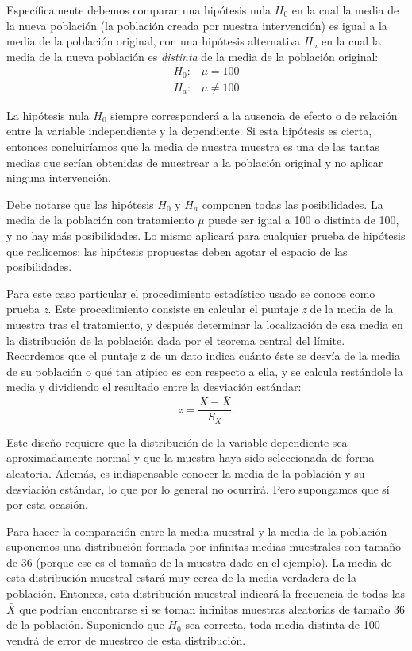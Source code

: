 \documentclass[a4paper,12pt]{article}
\begin{document}
Específicamente debemos comparar una  hipótesis nula $H_{0}$ en la cual la media de la nueva población (la población creada por nuestra intervención) es igual a la media de la población original, con una hipótesis alternativa $H_{a}$ en la cual la media de la nueva población es {\slshape distinta} de la media de la población original:
\begin{eqnarray*}
  H_{0}: & \mu = 100\\
  H_{a}: & \mu \neq 100
\end{eqnarray*}

La hipótesis nula $H_{0}$ siempre corresponderá a la ausencia de efecto o de relación entre la variable independiente y la dependiente. Si esta hipótesis es cierta, entonces concluiríamos que la media de nuestra muestra es una de las tantas medias que serían obtenidas de muestrear a la población original y no aplicar ninguna intervención.

Debe notarse que las hipótesis $H_{0}$ y $H_{a}$ componen todas las posibilidades. La media de la población con tratamiento $\mu$ puede ser igual a 100 o distinta de 100, y no hay más posibilidades. Lo mismo aplicará para cualquier prueba de hipótesis que realicemos: las hipótesis propuestas deben agotar el espacio de las posibilidades.

Para este caso particular el procedimiento estadístico usado se conoce como prueba {\itshape z}. Este procedimiento consiste en calcular el puntaje {\itshape z} de la media de la muestra tras el tratamiento, y después determinar la localización de esa media en la distribución de la población dada por el teorema central del límite. Recordemos que el puntaje z de un dato indica cuánto éste se desvía de la media de su población o qué tan atípico es con respecto a ella, y se calcula restándole la media y dividiendo el resultado entre la desviación estándar:
\[
z = \frac{
  X - \bar{X}
}{
  S_{X}
}
.\]

Este diseño requiere que la distribución de la variable dependiente sea aproximadamente normal y que la muestra haya sido seleccionada de forma aleatoria. Además, es indispensable conocer la media de la población y su desviación estándar, lo que por lo general no ocurrirá. Pero supongamos que sí por esta ocasión.

Para hacer la comparación entre la media muestral y la media de la población suponemos una distribución formada por infinitas medias muestrales con tamaño de 36 (porque ese es el tamaño de la muestra dado en el ejemplo). La media de esta distribución muestral estará muy cerca de la media verdadera de la población. Entonces, esta distribución muestral indicará la frecuencia de todas las $\bar{X}$ que podrían encontrarse si se toman infinitas muestras aleatorias de tamaño 36 de la población. Suponiendo que $H_{0}$ sea correcta, toda media distinta de 100 vendrá de error de muestreo de esta distribución.
\end{document}
